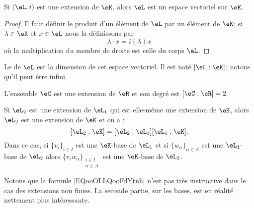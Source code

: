 \begin{lemma}       \label{LemooOLIIooXzdppM}
    Si \( (\eL,i)\) est une extension de \( \eK\), alors \( \eL\) est un espace vectoriel sur \( \eK\).
\end{lemma}

\begin{proof}
    Il faut définir le produit d'un élément de \( \eL\) par un élément de \( \eK\); si \( \lambda\in \eK\) et \( x\in \eL\) nous la définissons par
    \begin{equation}
        \lambda\cdot x=i(\lambda)x
    \end{equation}
    où la multiplication du membre de droite est celle du corps \( \eL\).
\end{proof}

\begin{definition}      \label{DefUYiyieu}
    Le  de \( \eL\) est la dimension de cet espace vectoriel. Il est noté \( [\eL:\eK]\); notons qu'il peut être infini.
\end{definition}

\begin{example}
    L'ensemble \( \eC\) est une extension de \( \eR\) et son degré est \( [\eC:\eR]=2\).
\end{example}

\begin{proposition}        \label{PROPooEGSJooBSocTf} \label{PropGWazMpY}
    Si \( \eL_2\) est une extension de \( \eL_1\) qui est elle-même une extension de \( \eK\), alors \( \eL_2\) est une extension de \( \eK\) et on a :
    \begin{equation}        \label{EQooOLLQooFdYtnh}
        [\eL_2:\eK]=[\eL_2:\eL_1][\eL_1:\eK].
    \end{equation}
    Dans ce cas, si \( \{ v_i \}_{i\in I}\) est une \( \eK\)-base de \( \eL_1\) et si \( \{ w_{\alpha} \}_{\alpha\in A}\) est une \( \eL_1\)-base de \( \eL_2\) alors \( \{ v_iw_{\alpha} \}_{\substack{i\in I\\\alpha\in A}}\) est une \( \eK\)-base de \( \eL_2\).
\end{proposition}

Notons que la formule \eqref{EQooOLLQooFdYtnh} n'est pas très instructive dans le cas des extensions non finies. La seconde partie, sur les bases, est en réalité nettement plus intéressante.


